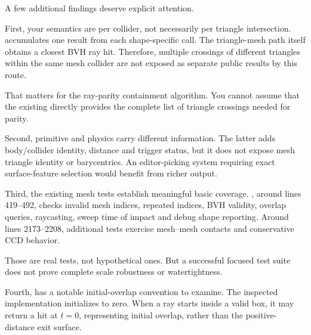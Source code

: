 A few additional findings deserve explicit attention.

First, your  semantics are per collider, not necessarily per triangle intersection.  accumulates one result from each shape-specific  call. The triangle-mesh path itself obtains a closest BVH ray hit. Therefore, multiple crossings of different triangles within the same mesh collider are not exposed as separate public results by this route.

That matters for the ray-parity containment algorithm. You cannot assume that the existing  directly provides the complete list of triangle crossings needed for parity.

Second, primitive  and physics  carry different information. The latter adds body/collider identity, distance and trigger status, but it does not expose mesh triangle identity or barycentrics. An editor-picking system requiring exact surface-feature selection would benefit from richer output.

Third, the existing mesh tests establish meaningful basic coverage. , around lines 419--492, checks invalid mesh indices, repeated indices, BVH validity, overlap queries, raycasting, sweep time of impact and debug shape reporting. Around lines 2173--2208, additional tests exercise mesh--mesh contacts and conservative CCD behavior.

Those are real tests, not hypothetical ones. But a successful focused test suite does not prove complete scale robustness or watertightness.

Fourth,  has a notable initial-overlap convention to examine. The inspected implementation initializes  to zero. When a ray starts inside a valid box, it may return a hit at \(t=0\), representing initial overlap, rather than the positive-distance exit surface.

